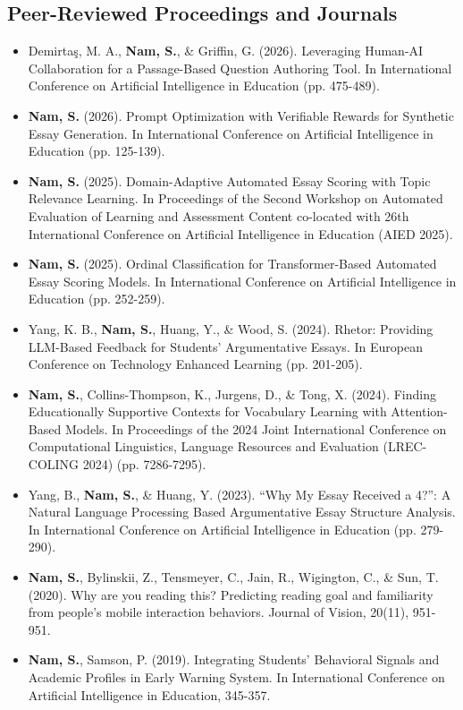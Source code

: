 \documentclass[11pt,a4paper]{article}
\begin{document}
\subsection*{Peer-Reviewed Proceedings and Journals}
\begin{itemize}
    \item Demirtaş, M. A., \textbf{Nam, S.}, \& Griffin, G. (2026). Leveraging Human-AI Collaboration for a Passage-Based Question Authoring Tool. In International Conference on Artificial Intelligence in Education (pp. 475-489).
    \item \textbf{Nam, S.} (2026). Prompt Optimization with Verifiable Rewards for Synthetic Essay Generation. In International Conference on Artificial Intelligence in Education (pp. 125-139).
    \item \textbf{Nam, S.} (2025). Domain-Adaptive Automated Essay Scoring with Topic Relevance Learning. In Proceedings of the Second Workshop on Automated Evaluation of Learning and Assessment Content co-located with 26th International Conference on Artificial Intelligence in Education (AIED 2025).
    \item \textbf{Nam, S.} (2025). Ordinal Classification for Transformer-Based Automated Essay Scoring Models. In International Conference on Artificial Intelligence in Education (pp. 252-259).
    \item Yang, K. B., \textbf{Nam, S.}, Huang, Y., \& Wood, S. (2024). Rhetor: Providing LLM-Based Feedback for Students' Argumentative Essays. In European Conference on Technology Enhanced Learning (pp. 201-205).
    \item \textbf{Nam, S.}, Collins-Thompson, K., Jurgens, D., \& Tong, X. (2024). Finding Educationally Supportive Contexts for Vocabulary Learning with Attention-Based Models. In Proceedings of the 2024 Joint International Conference on Computational Linguistics, Language Resources and Evaluation (LREC-COLING 2024) (pp. 7286-7295).
    \item Yang, B., \textbf{Nam, S.}, \& Huang, Y. (2023). ``Why My Essay Received a 4?'': A Natural Language Processing Based Argumentative Essay Structure Analysis. In International Conference on Artificial Intelligence in Education (pp. 279-290). %
    \item \textbf{Nam, S.}, Bylinskii, Z., Tensmeyer, C., Jain, R., Wigington, C., \& Sun, T. (2020). Why are you reading this? Predicting reading goal and familiarity from people's mobile interaction behaviors. Journal of Vision, 20(11), 951-951.
    \item \textbf{Nam, S.}, Samson, P. (2019). Integrating Students' Behavioral Signals and Academic Profiles in Early Warning System. In International Conference on Artificial Intelligence in Education, 345-357. %

\end{itemize}
\end{document}
